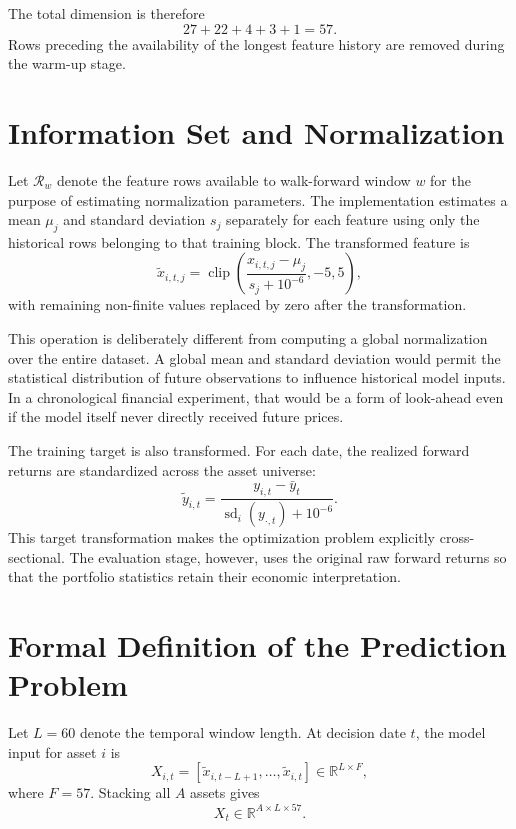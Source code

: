 \documentclass[10pt]{article}
\begin{document}
The total dimension is therefore
\begin{equation}
27+22+4+3+1=57.
\end{equation}
Rows preceding the availability of the longest feature history are removed during the warm-up stage.

\section{Information Set and Normalization}

Let $\mathcal{R}_w$ denote the feature rows available to walk-forward window $w$ for the purpose of estimating normalization parameters. The implementation estimates a mean $\mu_j$ and standard deviation $s_j$ separately for each feature using only the historical rows belonging to that training block. The transformed feature is
\begin{equation}
\tilde{x}_{i,t,j}
=
\operatorname{clip}
\left(
\frac{x_{i,t,j}-\mu_j}{s_j+10^{-6}},
-5,5
\right),
\end{equation}
with remaining non-finite values replaced by zero after the transformation.

This operation is deliberately different from computing a global normalization over the entire dataset. A global mean and standard deviation would permit the statistical distribution of future observations to influence historical model inputs. In a chronological financial experiment, that would be a form of look-ahead even if the model itself never directly received future prices.

The training target is also transformed. For each date, the realized forward returns are standardized across the asset universe:
\begin{equation}
\tilde{y}_{i,t}
=
\frac{y_{i,t}-\bar{y}_t}
{\operatorname{sd}_i(y_{\cdot,t})+10^{-6}}.
\end{equation}
This target transformation makes the optimization problem explicitly cross-sectional. The evaluation stage, however, uses the original raw forward returns so that the portfolio statistics retain their economic interpretation.

\section{Formal Definition of the Prediction Problem}

Let $L=60$ denote the temporal window length. At decision date $t$, the model input for asset $i$ is
\begin{equation}
X_{i,t}
=
\left[
\tilde{x}_{i,t-L+1},
\ldots,
\tilde{x}_{i,t}
\right]
\in\mathbb{R}^{L\times F},
\end{equation}
where $F=57$. Stacking all $A$ assets gives
\begin{equation}
X_t\in\mathbb{R}^{A\times L\times57}.
\end{equation}
\end{document}
